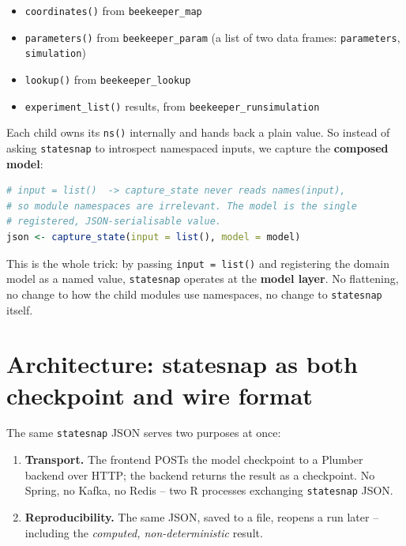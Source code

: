 \documentclass[12pt,a4paper]{article}
\begin{document}
\begin{itemize}[nosep]
  \item \texttt{coordinates()} \quad from \texttt{beekeeper\_map}
  \item \texttt{parameters()} \quad from \texttt{beekeeper\_param}
        (a list of two data frames: \texttt{parameters}, \texttt{simulation})
  \item \texttt{lookup()} \quad from \texttt{beekeeper\_lookup}
  \item \texttt{experiment\_list()} \quad results, from \texttt{beekeeper\_runsimulation}
\end{itemize}

Each child owns its \texttt{ns()} internally and hands back a plain value. So
instead of asking \texttt{statesnap} to introspect namespaced inputs, we capture
the \textbf{composed model}:

\begin{lstlisting}[language=R]
# input = list()  -> capture_state never reads names(input),
# so module namespaces are irrelevant. The model is the single
# registered, JSON-serialisable value.
json <- capture_state(input = list(), model = model)
\end{lstlisting}

This is the whole trick: by passing \texttt{input = list()} and registering the
domain model as a named value, \texttt{statesnap} operates at the
\textbf{model layer}. No flattening, no change to how the child modules use
namespaces, no change to \texttt{statesnap} itself.

\section{Architecture: statesnap as both checkpoint and wire format}

The same \texttt{statesnap} JSON serves two purposes at once:

\begin{enumerate}[nosep]
  \item \textbf{Transport.} The frontend POSTs the model checkpoint to a Plumber
    backend over HTTP; the backend returns the result as a checkpoint. No
    Spring, no Kafka, no Redis -- two R processes exchanging \texttt{statesnap}
    JSON.
  \item \textbf{Reproducibility.} The same JSON, saved to a file, reopens a run
    later -- including the \emph{computed, non-deterministic} result.
\end{enumerate}
\end{document}

